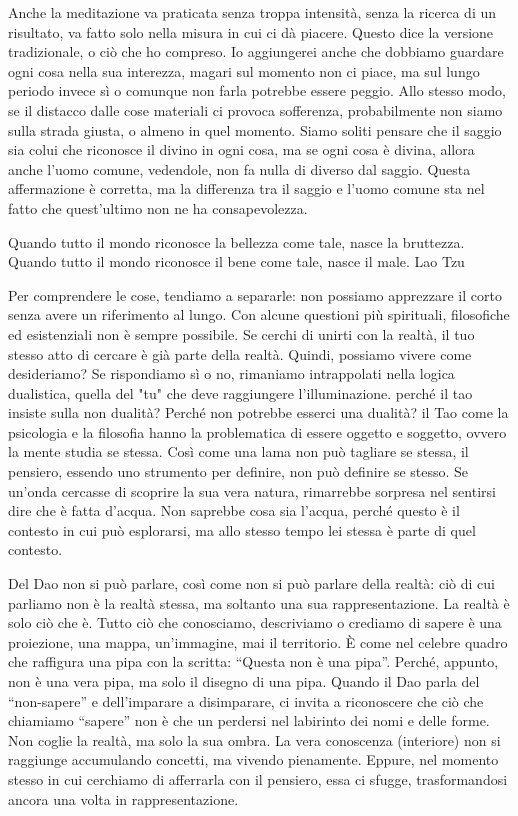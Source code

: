 \documentclass[12pt]{book} %
\begin{document}
Anche la meditazione va praticata senza troppa intensità, senza la ricerca di un risultato, va fatto solo nella misura in cui ci dà piacere. Questo dice la versione tradizionale, o ciò che ho compreso. Io aggiungerei anche che dobbiamo guardare ogni cosa nella sua interezza, magari sul momento non ci piace, ma sul lungo periodo invece sì o comunque non farla potrebbe essere peggio. Allo stesso modo, se il distacco dalle cose materiali ci provoca sofferenza, probabilmente non siamo sulla strada giusta, o almeno in quel momento.
Siamo soliti pensare che il saggio sia colui che riconosce il divino in ogni cosa, ma se ogni cosa è divina, allora anche l'uomo comune, vedendole, non fa nulla di diverso dal saggio. Questa affermazione è corretta, ma la differenza tra il saggio e l'uomo comune sta nel fatto che quest'ultimo non ne ha consapevolezza. 

Quando tutto il mondo riconosce la bellezza come tale, nasce la bruttezza.
Quando tutto il mondo riconosce il bene come tale, nasce il male.
Lao Tzu

Per comprendere le cose, tendiamo a separarle: non possiamo apprezzare il corto senza avere un riferimento al lungo. Con alcune questioni più spirituali, filosofiche ed esistenziali non è sempre possibile. 
Se cerchi di unirti con la realtà, il tuo stesso atto di cercare è già parte della realtà. Quindi, possiamo vivere come desideriamo? Se rispondiamo sì o no, rimaniamo intrappolati nella logica dualistica, quella del "tu" che deve raggiungere l'illuminazione.
perché il tao insiste sulla non dualità? Perché non potrebbe esserci una dualità? il Tao come la psicologia e la filosofia hanno la problematica di essere oggetto e soggetto, ovvero la mente studia se stessa. 
Così come una lama non può tagliare se stessa, il pensiero, essendo uno strumento per definire, non può definire se stesso.
Se un'onda cercasse di scoprire la sua vera natura, rimarrebbe sorpresa nel sentirsi dire che è fatta d'acqua. Non saprebbe cosa sia l'acqua, perché questo è il contesto in cui può esplorarsi, ma allo stesso tempo lei stessa è parte di quel contesto.

Del Dao non si può parlare, così come non si può parlare della realtà: ciò di cui parliamo non è la realtà stessa, ma soltanto una sua rappresentazione.
La realtà è solo ciò che è. Tutto ciò che conosciamo, descriviamo o crediamo di sapere è una proiezione, una mappa, un'immagine, mai il territorio.
È come nel celebre quadro che raffigura una pipa con la scritta: “Questa non è una pipa”. Perché, appunto, non è una vera pipa, ma solo il disegno di una pipa.
Quando il Dao parla del “non-sapere” e dell’imparare a disimparare, ci invita a riconoscere che ciò che chiamiamo “sapere” non è che un perdersi nel labirinto dei nomi e delle forme. Non coglie la realtà, ma solo la sua ombra.
La vera conoscenza (interiore) non si raggiunge accumulando concetti, ma vivendo pienamente. Eppure, nel momento stesso in cui cerchiamo di afferrarla con il pensiero, essa ci sfugge, trasformandosi ancora una volta in rappresentazione. 
\end{document}
